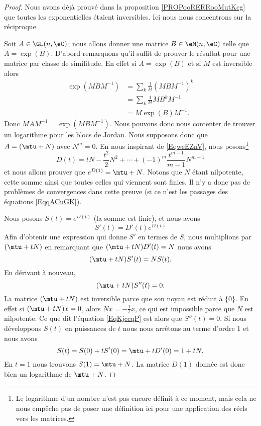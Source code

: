 \begin{proof}
	Nous avons déjà prouvé dans la proposition \ref{PROPooRERRooMutKcg} que toutes les exponentielles étaient inversibles. Ici nous nous concentrons sur la réciproque.

	Soit \( A\in \GL(n,\eC)\); nous allons donner une matrice \( B\in \eM(n,\eC)\) telle que \( A=\exp(B)\). D'abord remarquons qu'il suffit de prouver le résultat pour une matrice par classe de similitude. En effet si \( A=\exp(B)\) et si \( M\) est inversible alors
	\begin{subequations}    \label{EqqACuGK}
		\begin{align}
			\exp(MBM^{-1}) & =\sum_k\frac{1}{ k! }(MBM^{-1})^k \\
			               & =\sum_k\frac{1}{ k! }MB^kM^{-1}   \\
			               & =M\exp(B)M^{-1}.
		\end{align}
	\end{subequations}
	Donc \( MAM^{-1}=\exp(MBM^{-1})\). Nous pouvons donc nous contenter de trouver un logarithme pour les blocs de Jordan. Nous supposons donc que \( A=(\mtu+N)\) avec \( N^m=0\).
	En nous inspirant de \eqref{EqweEZnV}, nous posons\footnote{Le logarithme d'un nombre n'est pas encore définit à ce moment, mais cela ne nous empêche pas de poser une définition ici pour une application des réels vers les matrices.}
	\begin{equation}
		D(t)=tN-\frac{ t^2 }{ 2 }N^2+\cdots +(-1)^m\frac{ t^{m-1} }{ m-1 }N^{m-1}
	\end{equation}
	et nous allons prouver que \(  e^{D(1)}=\mtu+N\). Notons que \( N\) étant nilpotente, cette somme ainsi que toutes celles qui viennent sont finies. Il n'y a donc pas de problèmes de convergences dans cette preuve (si ce n'est les passages des équations \eqref{EqqACuGK}).

	Nous posons \( S(t)= e^{D(t)}\) (la somme est finie), et nous avons
	\begin{equation}
		S'(t)=D'(t) e^{D(t)}
	\end{equation}
	Afin d'obtenir une expression qui donne \( S'\) en termes de \( S\), nous multiplions par \( (\mtu+tN)\) en remarquant que \( (\mtu+tN)D'(t)=N\) nous avons
	\begin{equation}
		(\mtu+tN)S'(t)=NS(t).
	\end{equation}
	En dérivant à nouveau,
	\begin{equation}    \label{EqKjccqP}
		(\mtu+tN)S''(t)=0.
	\end{equation}
	La matrice \( (\mtu+tN)\) est inversible parce que son noyau est réduit à \( \{ 0 \}\). En effet si \( (\mtu+tN)x=0\), alors \( Nx=-\frac{1}{ t }x\), ce qui est impossible parce que \( N\) est nilpotente. Ce que dit l'équation \eqref{EqKjccqP} est alors que \( S''(t)=0\). Si nous développons \( S(t)\) en puissances de \( t\) nous nous arrêtons au terme d'ordre \( 1\) et nous avons
	\begin{equation}
		S(t)=S(0)+tS'(0)=\mtu+tD'(0)=1+tN.
	\end{equation}
	En \( t=1\) nous trouvons \( S(1)=\mtu+N\). La matrice \( D(1)\) donnée est donc bien un logarithme de \( \mtu+N\).
\end{proof}

